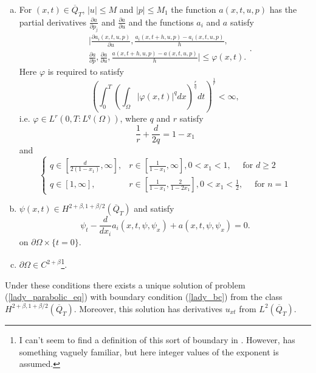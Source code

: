 \documentclass[11pt, a4paper]{article}
\begin{document}
\begin{theorem}
\begin{enumerate}[a)]
	\item For $(x,t) \in \overline{Q}_T$, $|u| \leq M$ and $|p| \leq M_1$ the function $a(x,t,u,p)$ has the partial derivatives $\frac{\partial a}{\partial p_j}$ and $\frac{\partial a}{\partial u}$ and the functions $a_i$ and $a$ satisfy
	\begin{equation}
	\label{exist_cond4}
	\begin{split}
		&\Bigg| \frac{\partial a_i(x,t,u,p)}{\partial u}, \frac{a_i(x,t+h,u,p) - 		a_i(x,t,u,p)}{h}, \\
		&\frac{\partial a}{\partial p}, \frac{\partial a}{\partial u}, \frac{a(x,t+h,u,p) - a(x,t,u,p)}{h} \Bigg| \leq \varphi(x,t).
	\end{split}.
	\end{equation}
	Here $\varphi$ is required to satisfy
	\begin{equation*}
	\left( \int_0^T \left(\int_\Omega |\varphi(x,t)|^q dx\right)^\frac{r}{q} dt 			\right)^\frac{1}{r} < \infty,
	\end{equation*}
	i.e. $\varphi \in L^r(0,T: L^q(\Omega))$, where $q$ and $r$ satisfy
	\begin{equation*}
	\frac{1}{r} + \frac{d}{2q} = 1 - x_1
	\end{equation*}
	and
	\begin{equation*}
	\begin{cases}
		q\in \left[\frac{d}{2(1-x_1)},\infty\right], &r\in \left[\frac{1}{1-x_1},\infty \right], 0<x_1<1, \quad \text{ for } d \geq 2 \\
		q \in [1, \infty], &r \in \left[\frac{1}{1-x_1},\frac{2}{1-2x_1}\right], 0<x_1<\frac{1}{2}, \quad \text{ for } n=1
	\end{cases}
\end{equation*}
	
	\item $\psi(x,t) \in H^{2+\beta, 1+\beta/2}(\overline{Q}_T)$ and satisfy
	\begin{equation}
	\label{exist_cond5}
	\psi_t - \frac{d}{dx_i}a_i(x,t,\psi,\psi_x) + a(x,t,\psi,\psi_x) = 0.
	\end{equation}
	on $\partial \Omega \times \{t=0\}$.
	
	\item $\partial \Omega \in C^{2+\beta}$\footnote{I can't seem to find a definition of this sort of boundary in \citep{ladyzhenskaya}. However, \citep{evans} has something vaguely familiar, but here integer values of the exponent is assumed.}.
\end{enumerate}

Under these conditions there exists a unique solution of problem (\ref{lady_parabolic_eq})  with boundary condition (\ref{lady_bc}) from the class $H^{2+\beta, 1+\beta/2}(\overline{Q}_T)$. Moreover, this solution has derivatives $u_{xt}$ from $L^2(\overline{Q}_T)$.
\end{theorem}
\end{document}
